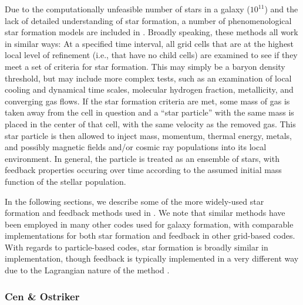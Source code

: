 Due to the computationally unfeasible number of stars in a galaxy
($10^{11}$) and the lack of detailed understanding of star formation, a
number of phenomenological star formation models are included in
\enzo.
Broadly speaking, these methods all work in similar
ways: At a specified time interval, all grid cells that are at the
highest local level of refinement (i.e., that have no child cells) are
examined to see if they meet a set of criteria for star formation.
This may simply be a baryon density threshold, but may include more
complex tests, such as an examination of local cooling and dynamical
time scales, molecular hydrogen fraction, metallicity, and converging
gas flows.  If the star formation criteria are met, some mass of gas
is taken away from the cell in question and a ``star particle'' with
the same mass is placed in the center of that cell, with the same
velocity as the removed gas.  This star particle is then
allowed to inject mass, momentum, thermal energy, metals, and possibly
magnetic fields and/or cosmic ray populations into its local
environment.  In general, the particle is treated as an ensemble of
stars, with feedback properties occuring over time according to the
assumed initial mass function of the stellar population.

In the following sections, we describe some of the more widely-used
star formation and feedback methods used in \enzo.  We note that
similar methods have been employed in many other codes used for galaxy
formation, with comparable implementations for both star formation and
feedback in other grid-based codes.  With regards to particle-based
codes, star formation is broadly similar in implementation, though
feedback is typically implemented in a very different way due to the
Lagrangian nature of the method \citep[see,
e.g.,][]{sh03a,sh03b,hs03}.

\subsubsection{Cen \& Ostriker}
\label{sec:starform_cen}

